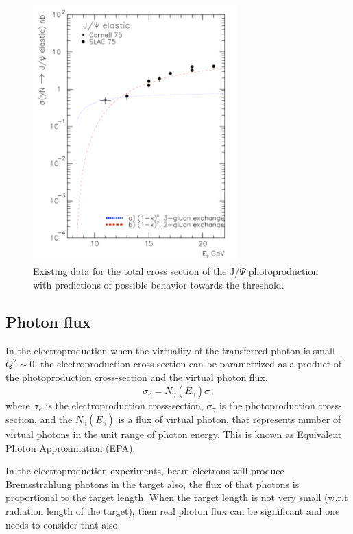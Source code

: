 \documentclass[12pt]{revtex4}
\begin{document}
\begin{figure}[htbp]
\begin{center}
\includegraphics[width=0.7\textwidth]{jp_measured.pdf}
\caption{Existing data for the total cross section of the J/$\Psi$ photoproduction with predictions of possible behavior towards the threshold.}
\label{fig:jpmeas}
\end{center}
\end{figure}

\subsection{Photon flux}

In the electroproduction when the virtuality of the transferred photon is small $Q^{2} \sim 0$,  
 the electroproduction cross-section can be parametrized as a product of the photoproduction cross-section and the
 virtual photon flux.
 \begin{equation}
  \sigma_{e} = N_{\gamma}(E_{\gamma})\sigma_{\gamma}
 \end{equation}
 where $\sigma_{e}$ is the electroproduction cross-section, $\sigma_{\gamma}$ is
 the photoproduction cross-section, and the $N_{\gamma}(E_{\gamma})$ is a flux of virtual photon, that represents
 number of virtual photons in the unit range of photon energy. This is known as
 Equivalent Photon Approximation (EPA).
 
 In the electroproduction experiments, beam electrons will produce Bremsstrahlung photons in the target also,
 the flux of that photons is proportional to the target length.
 When the target length is not very small (w.r.t radiation  length of the target), then real photon flux
 can be significant and one needs to consider that also.
 
\end{document}
